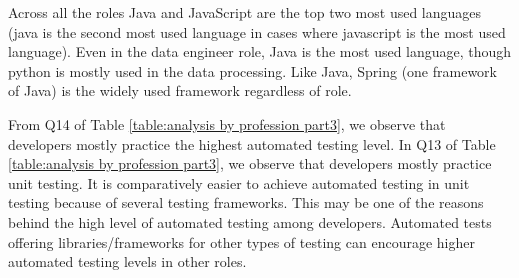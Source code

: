 Across all the roles Java and JavaScript are the top two most used languages (java is the second most used language in cases where javascript is the most used language). Even in the data engineer role, Java is the most used language, though python is mostly used in the data processing. Like Java, Spring (one framework of Java) is the widely used framework regardless of role.

From Q14 of Table \ref{table:analysis by profession part3}, we observe that developers mostly practice the highest automated testing level. In Q13 of Table \ref{table:analysis by profession part3}, we observe that developers mostly practice unit testing. It is comparatively easier to achieve automated testing in unit testing because of several testing frameworks. This may be one of the reasons behind the high level of automated testing among developers. Automated tests offering libraries/frameworks for other types of testing can encourage higher automated testing levels in other roles.
